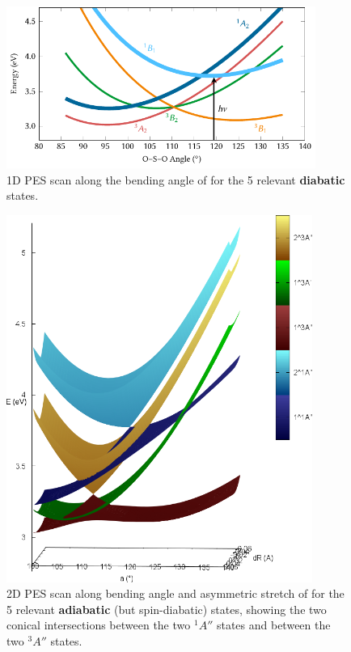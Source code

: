 \documentclass[a4paper,11pt,DIV=15,openany]{scrbook}
\begin{document}
\begin{figure}[p]
  \centering
   \includegraphics[width=0.9\textwidth]{img/pes/pes.pdf}
   \caption{1D PES scan along the bending angle of  for the 5 relevant \textbf{diabatic} states.}\label{fig:PES_1D} 
\end{figure}
\begin{figure}[p]
  \centering
  \includegraphics[height=12cm]{figures/plot_2D_trim.png}
  \caption{2D PES scan along bending angle and asymmetric stretch of  for the 5 relevant \textbf{adiabatic} (but spin-diabatic) states, showing the two conical intersections between the two $^1A''$ states and between the two $^3A''$ states.}\label{fig:PES_2D}
\end{figure}
\end{document}
